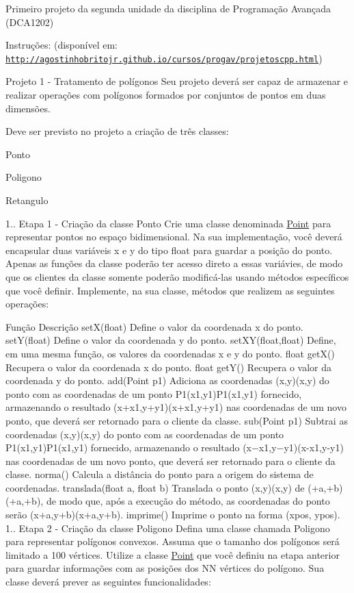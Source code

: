 Primeiro projeto da segunda unidade da disciplina de Programação Avançada (D\+C\+A1202)

Instruções\+: (disponível em\+: \href{http://agostinhobritojr.github.io/cursos/progav/projetoscpp.html}{\tt http\+://agostinhobritojr.\+github.\+io/cursos/progav/projetoscpp.\+html})


\begin{DoxyEnumerate}
\item Projeto 1 -\/ Tratamento de polígonos Seu projeto deverá ser capaz de armazenar e realizar operações com polígonos formados por conjuntos de pontos em duas dimensões.
\end{DoxyEnumerate}

Deve ser previsto no projeto a criação de três classes\+:

Ponto

Poligono

Retangulo

1.. Etapa 1 -\/ Criação da classe Ponto Crie uma classe denominada \hyperlink{class_point}{Point} para representar pontos no espaço bidimensional. Na sua implementação, você deverá encapsular duas variáveis x e y do tipo float para guardar a posição do ponto. Apenas as funções da classe poderão ter acesso direto a essas variávies, de modo que os clientes da classe somente poderão modificá-\/las usando métodos específicos que você definir. Implemente, na sua classe, métodos que realizem as seguintes operações\+:

Função Descrição set\+X(float) Define o valor da coordenada x do ponto. set\+Y(float) Define o valor da coordenada y do ponto. set\+X\+Y(float,float) Define, em uma mesma função, os valores da coordenadas x e y do ponto. float get\+X() Recupera o valor da coordenada x do ponto. float get\+Y() Recupera o valor da coordenada y do ponto. add(\+Point p1) Adiciona as coordenadas (x,y)(x,y) do ponto com as coordenadas de um ponto P1(x1,y1)P1(x1,y1) fornecido, armazenando o resultado (x+x1,y+y1)(x+x1,y+y1) nas coordenadas de um novo ponto, que deverá ser retornado para o cliente da classe. sub(\+Point p1) Subtrai as coordenadas (x,y)(x,y) do ponto com as coordenadas de um ponto P1(x1,y1)P1(x1,y1) fornecido, armazenando o resultado (x−x1,y−y1)(x-\/x1,y-\/y1) nas coordenadas de um novo ponto, que deverá ser retornado para o cliente da classe. norma() Calcula a distância do ponto para a origem do sistema de coordenadas. translada(float a, float b) Translada o ponto (x,y)(x,y) de (+a,+b)(+a,+b), de modo que, após a execução do método, as coordenadas do ponto serão (x+a,y+b)(x+a,y+b). imprime() Imprime o ponto na forma (xpos, ypos). 1.. Etapa 2 -\/ Criação da classe Poligono Defina uma classe chamada Poligono para representar polígonos convexos. Assuma que o tamanho dos polígonos será limitado a 100 vértices. Utilize a classe \hyperlink{class_point}{Point} que você definiu na etapa anterior para guardar informações com as posições dos NN vértices do polígono. Sua classe deverá prever as seguintes funcionalidades\+:

